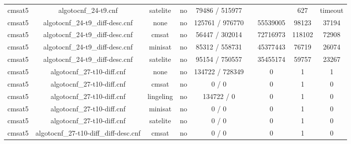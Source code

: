 \begin{appendices}
\begin{table}[p]
\begin{center}
\begin{tabular}{l|cccccccc}
  cmsat5                         & algotocnf\_24-t9.cnf           & satelite   & no    & 79486 / 515977 &           &           & 627        & timeout \\ %
  cmsat5                         & algotocnf\_24-t9\_diff-desc.cnf & none       & no    & 125761 / 976770 &           & 55539005  & 98123      & 37194 \\ %
  cmsat5                         & algotocnf\_24-t9\_diff-desc.cnf & cmsat      & no    & 56447 / 302014 &           & 72716973  & 118102     & 72908 \\ %
  cmsat5                         & algotocnf\_24-t9\_diff-desc.cnf & minisat    & no    & 85312 / 558731 &           & 45377443  & 76719      & 26074 \\ %
  cmsat5                         & algotocnf\_24-t9\_diff-desc.cnf & satelite   & no    & 95154 / 750557 &           & 35455174  & 59757      & 23267 \\ %
  cmsat5                         & algotocnf\_27-t10-diff.cnf     & none       & no    & 134722 / 728349 &           & 0         & 1          & 1 \\ %
  cmsat5                         & algotocnf\_27-t10-diff.cnf     & cmsat      & no    & 0 / 0      &           & 0         & 1          & 0 \\ %
  cmsat5                         & algotocnf\_27-t10-diff.cnf     & lingeling  & no    & 134722 / 0 &           & 0         & 1          & 0 \\ %
  cmsat5                         & algotocnf\_27-t10-diff.cnf     & minisat    & no    & 0 / 0      &           & 0         & 1          & 0 \\ %
  cmsat5                         & algotocnf\_27-t10-diff.cnf     & satelite   & no    & 0 / 0      &           & 0         & 1          & 0 \\ %
  cmsat5                         & algotocnf\_27-t10-diff\_diff-desc.cnf & cmsat      & no    & 0 / 0      &           & 0         & 1          & 0 \\ %

\end{tabular}
\end{center}
\end{table}
\end{appendices}
